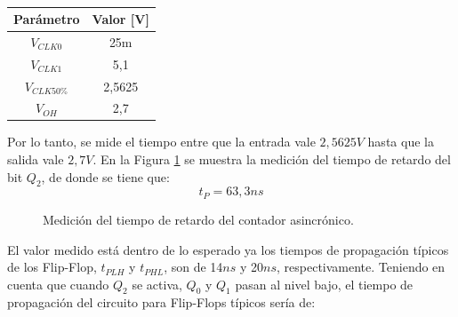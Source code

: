%
\begin{table}[H]
\centering
\begin{tabular}{|c|c|}
\hline
\textbf{Par\'ametro} & \textbf{Valor {[}V{]}} \\ \hline
$V_{CLK0}$       & 25m                  \\ \hline
$V_{CLK1}$       & 5,1                    \\ \hline
$V_{CLK50\%}$    & 2,5625                 \\ \hline
$V_{OH}$         & 2,7                    \\ \hline
\end{tabular}
\caption{}
\label{ej7_tab:valores_medicion}
\end{table}
%
\noindent
 Por lo tanto, se mide el tiempo entre que la entrada vale $2,5625V$ hasta que la salida vale $2,7V$. En la Figura \ref{ej7_fig:asinc_measure1} se muestra la medici\'on del tiempo de retardo del bit $Q_2$, de donde se tiene que:
 \begin{equation}
     t_P = 63,3ns
 \end{equation} 
%
\begin{figure}[H]
	\centering
	\caption{Medici\'on del tiempo de retardo del contador asincr\'onico.}
	\label{ej7_fig:asinc_measure1}
\end{figure}
%
\noindent
El valor medido est\'a dentro de lo esperado ya los tiempos de propagaci\'on t\'ipicos de los Flip-Flop, $t_{PLH}$ y $t_{PHL}$, son de 14$ns$ y 20$ns$, respectivamente. Teniendo en cuenta que cuando $Q_2$ se activa, $Q_0$ y $Q_1$ pasan al nivel bajo, el tiempo de propagaci\'on del circuito para Flip-Flops t\'ipicos ser\'ia de:
